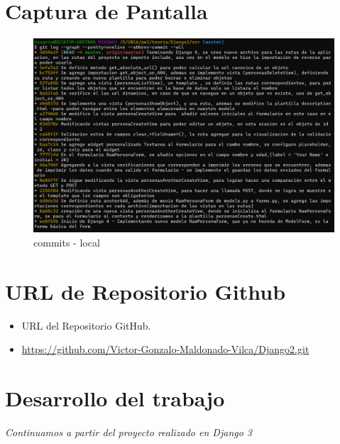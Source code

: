 \documentclass{article}
\begin{document}
	\section{Captura de Pantalla}
  \begin{figure}[H]
    \centering
    \includegraphics[width=1\textwidth, keepaspectratio]{img/commits1.png}
    \caption{commits - local}
  \end{figure}


  \section{URL de Repositorio Github}
  \begin{itemize}
    \item URL del Repositorio GitHub.
    \item \url{https://github.com/Victor-Gonzalo-Maldonado-Vilca/Django2.git}
  \end{itemize}


  \section{Desarrollo del trabajo}
  \textit{Continuamos a partir del proyecto realizado en Django 3}
  
\end{document}
